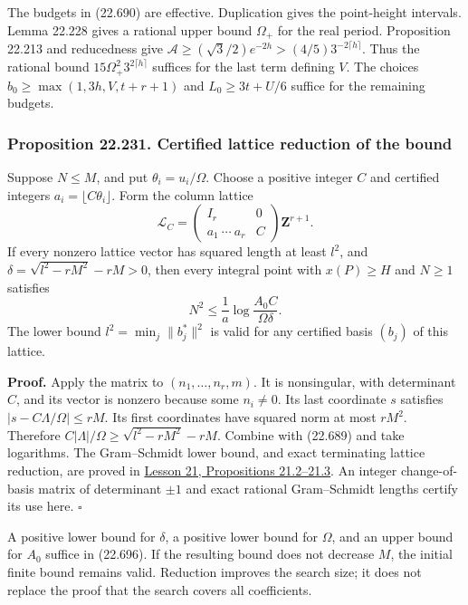 \documentclass[
  11pt,
  a4paper,
]{article}
\begin{document}
The budgets in (22.690) are effective. Duplication gives the
point-height intervals. Lemma 22.228 gives a rational upper bound
\(\Omega_+\) for the real period. Proposition 22.213 and reducedness
give \(\mathcal A\ge(\sqrt3/2)e^{-2h}>(4/5)3^{-2\lceil h\rceil}\). Thus
the rational bound \(15\Omega_+^2 3^{2\lceil h\rceil}\) suffices for the
last term defining \(V\). The choices \(b_0\ge\max(1,3h,V,t+r+1)\) and
\(L_0\ge3t+U/6\) suffice for the remaining budgets.

\subsubsection{Proposition 22.231. Certified lattice reduction of the
bound}\label{proposition-22.231.-certified-lattice-reduction-of-the-bound}

Suppose \(N\le M\), and put \(\theta_i=u_i/\Omega\). Choose a positive
integer \(C\) and certified integers \(a_i=\lfloor C\theta_i\rfloor\).
Form the column lattice \[
 \mathcal L_C=
 \begin{pmatrix}I_r&0\\
 a_1\ \cdots\ a_r&C\end{pmatrix}
 \mathbf Z^{r+1}.
 \tag{22.695}
\] If every nonzero lattice vector has squared length at least \(l^2\),
and \(\delta=\sqrt{l^2-rM^2}-rM>0\), then every integral point with
\(x(P)\ge H\) and \(N\ge1\) satisfies \[
 N^2\le\frac1a\log\frac{A_0C}{\Omega\delta}.
 \tag{22.696}
\] The lower bound \(l^2=\min_j\|b_j^*\|^2\) is valid for any certified
basis \((b_j)\) of this lattice.

\textbf{Proof.} Apply the matrix to \((n_1,\ldots,n_r,m)\). It is
nonsingular, with determinant \(C\), and its vector is nonzero because
some \(n_i\ne0\). Its last coordinate \(s\) satisfies
\(|s-C\Lambda/\Omega|\le rM\). Its first coordinates have squared norm
at most \(rM^2\). Therefore \(C|\Lambda|/\Omega\ge\sqrt{l^2-rM^2}-rM\).
Combine with (22.689) and take logarithms. The Gram--Schmidt lower
bound, and exact terminating lattice reduction, are proved in
\href{https://kokunoyumeto.github.io/open-math-courses-public/courses/TR-BAKER/TR-BAKER-21.html\#3-what-an-lll-certificate-proves}{Lesson 21,
Propositions 21.2--21.3}. An integer change-of-basis matrix of
determinant \(\pm1\) and exact rational Gram--Schmidt lengths certify
its use here. \(\square\)

A positive lower bound for \(\delta\), a positive lower bound for
\(\Omega\), and an upper bound for \(A_0\) suffice in (22.696). If the
resulting bound does not decrease \(M\), the initial finite bound
remains valid. Reduction improves the search size; it does not replace
the proof that the search covers all coefficients.
\end{document}
